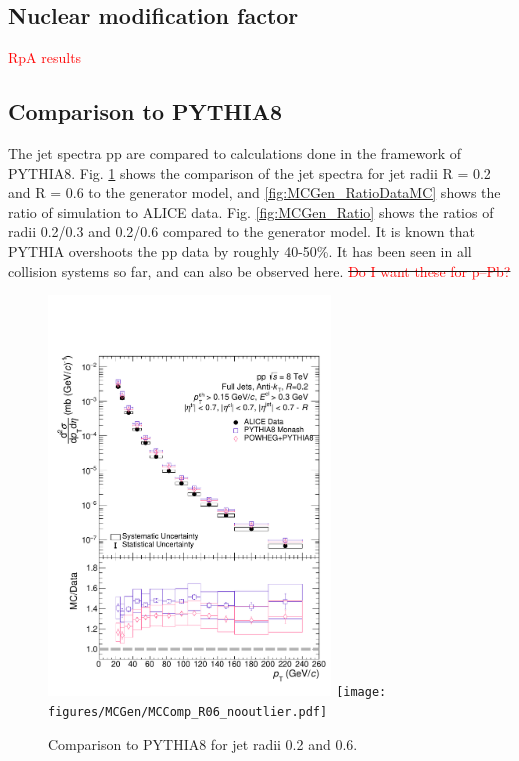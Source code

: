 \documentclass[ALICE]{ALICE_analysis_notes}
\newcommand{\pPb}{{\mbox{p--Pb}}\xspace}
\newcommand{\pp}{pp\xspace}
\providecommand{\DIFaddtex}[1]{{\protect\color{blue}\uwave{#1}}} %
\providecommand{\DIFdeltex}[1]{{\protect\color{red}\sout{#1}}}                      %
\providecommand{\DIFaddbegin}{} %
\providecommand{\DIFaddend}{} %
\providecommand{\DIFdelbegin}{} %
\providecommand{\DIFdelend}{} %
\providecommand{\DIFadd}[1]{\texorpdfstring{\DIFaddtex{#1}}{#1}} %
\providecommand{\DIFdel}[1]{\texorpdfstring{\DIFdeltex{#1}}{}} %
\newcommand{\DIFscaledelfig}{0.5}
\newlength{\DIFdelgraphicswidth} %
\newlength{\DIFdelgraphicsheight} %
\newcommand{\DIFaddincludegraphics}[2][]{{\color{blue}\fbox{\DIFOincludegraphics[#1]{#2}}}} %
\newcommand{\DIFdelincludegraphics}[2][]{%
\sbox{\DIFdelgraphicsbox}{\DIFOincludegraphics[#1]{#2}}%
\settoboxwidth{\DIFdelgraphicswidth}{\DIFdelgraphicsbox} %
\settoboxtotalheight{\DIFdelgraphicsheight}{\DIFdelgraphicsbox} %
\scalebox{\DIFscaledelfig}{%
\parbox[b]{\DIFdelgraphicswidth}{\usebox{\DIFdelgraphicsbox}\\[-\baselineskip] \rule{\DIFdelgraphicswidth}{0em}}\llap{\resizebox{\DIFdelgraphicswidth}{\DIFdelgraphicsheight}{%
\setlength{\unitlength}{\DIFdelgraphicswidth}%
\begin{picture}(1,1)%
\thicklines\linethickness{2pt} %
{\color[rgb]{1,0,0}\put(0,0){\framebox(1,1){}}}%
{\color[rgb]{1,0,0}\put(0,0){\line( 1,1){1}}}%
{\color[rgb]{1,0,0}\put(0,1){\line(1,-1){1}}}%
\end{picture}%
}\hspace*{3pt}}} %
} %
\DeclareRobustCommand{\DIFaddbegin}{\DIFOaddbegin \let\includegraphics\DIFaddincludegraphics} %
\DeclareRobustCommand{\DIFaddend}{\DIFOaddend \let\includegraphics\DIFOincludegraphics} %
\DeclareRobustCommand{\DIFdelbegin}{\DIFOdelbegin \let\includegraphics\DIFdelincludegraphics} %
\DeclareRobustCommand{\DIFdelend}{\DIFOaddend \let\includegraphics\DIFOincludegraphics} %
\begin{document}
\subsection{Nuclear modification factor}
\label{sec:resultsRpA}

\textcolor{red}{RpA results}

\subsection{Comparison to PYTHIA8}
\label{sec:mcComparison}

The jet spectra \DIFaddbegin \DIFadd{in }\pp \DIFaddend are compared to calculations done in the framework of PYTHIA8.
Fig. \ref{fig:MCGen} shows the comparison of the jet spectra for jet radii R = 0.2 and R = 0.6 to the generator model, and \ref{fig:MCGen_RatioDataMC} shows the ratio of simulation to ALICE data. Fig. \ref{fig:MCGen_Ratio} shows the ratios of radii 0.2/0.3 and 0.2/0.6 compared to the generator model. It is known that PYTHIA overshoots the \pp data by roughly 40-50\%. It has been seen in all collision systems so far, and can also be observed here.
\DIFdelbegin \DIFdel{\textcolor{red}{Do I want these for \pPb?}
}\DIFdelend 

\begin{figure}
    \centering
    \begin{multicols}{2}
            \includegraphics[width=7.5cm]{figures/MCGen/MCComp_R02_nooutlier.pdf}
        \vfill\null
        \columnbreak
            \texttt{[image: figures/MCGen/MCComp\_R06\_nooutlier.pdf]}
        \vfill\null
    \end{multicols}
    \caption{Comparison to PYTHIA8 for jet radii 0.2 and 0.6.}
    \label{fig:MCGen}
\end{figure}
\end{document}
